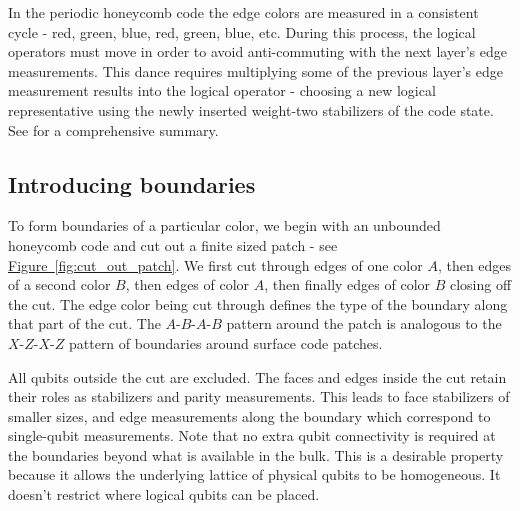 \documentclass[onecolumn,a4paper,accepted=2022-09-12]{quantumarticle}
\theoremstyle{definition}
\theoremstyle{definition}
\theoremstyle{definition}
\newcommand{\fig}[1]{\hyperref[fig:#1]{Figure~\ref*{fig:#1}}}
\begin{document}
In the periodic honeycomb code the edge colors are measured in a consistent cycle - red, green, blue, red, green, blue, etc.
During this process, the logical operators must move in order to avoid anti-commuting with the next layer's edge measurements.  
This dance requires multiplying some of the previous layer's edge measurement results into the logical operator - choosing a new logical representative using the newly inserted weight-two stabilizers of the code state.
See \cite{gidney2021honeycombmemory} for a comprehensive summary.

\subsection{Introducing boundaries}

To form boundaries of a particular color, we begin with an unbounded honeycomb code and cut out a finite sized patch - see \fig{cut_out_patch}.
We first cut through edges of one color $A$, then edges of a second color $B$, then edges of color $A$, then finally edges of color $B$ closing off the cut.
The edge color being cut through defines the type of the boundary along that part of the cut.
The $A$-$B$-$A$-$B$ pattern around the patch is analogous to the $X$-$Z$-$X$-$Z$ pattern of boundaries around surface code patches.

All qubits outside the cut are excluded.
The faces and edges inside the cut retain their roles as stabilizers and parity measurements.
This leads to face stabilizers of smaller sizes, and edge measurements along the boundary which correspond to single-qubit measurements.
Note that no extra qubit connectivity is required at the boundaries beyond what is available in the bulk.
This is a desirable property because it allows the underlying lattice of physical qubits to be homogeneous.
It doesn't restrict where logical qubits can be placed.
\end{document}
